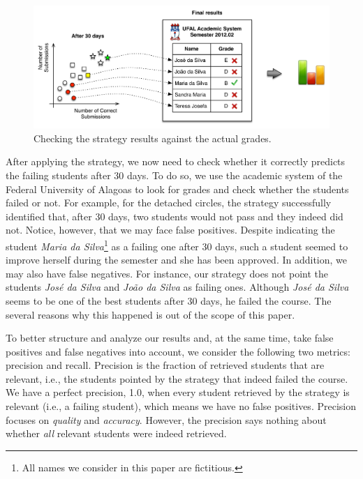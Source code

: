 \begin{figure}[htb]
\centering
\includegraphics[width=1.0\textwidth,natwidth=950,natheight=394]{images/Procedure.pdf}
\caption{Checking the strategy results against the actual grades.}
\label{fig:procedure}
\end{figure}

After applying the strategy, we now need to check whether it correctly predicts the failing students after 30 days. To do so, we use the academic system of the Federal University of Alagoas to look for grades and check whether the students failed or not. For example, for the detached circles, the strategy successfully identified that, after 30 days, two students would not pass and they indeed did not. Notice, however, that we may face false positives. Despite indicating the student \textit{Maria da Silva}\footnote{All names we consider in this paper are fictitious.} as a failing one after 30 days, such a student seemed to improve herself during the semester and she has been approved. In addition, we may also have false negatives. For instance, our strategy does not point the students \textit{Jos\'{e} da Silva} and \textit{Jo\~{a}o da Silva} as failing ones. Although \textit{Jos\'{e} da Silva} seems to be one of the best students after 30 days, he failed the course. The several reasons why this happened is out of the scope of this paper.

To better structure and analyze our results and, at the same time, take false positives and false negatives into account, we consider the following two metrics: precision and recall. Precision is the fraction of retrieved students that are relevant, i.e., the students pointed by the strategy that indeed failed the course. We have a perfect precision, 1.0, when every student retrieved by the strategy is relevant (i.e., a failing student), which means we have no false positives. Precision focuses on \textit{quality} and \textit{accuracy}. However, the precision says nothing about whether \textit{all} relevant students were indeed retrieved.

